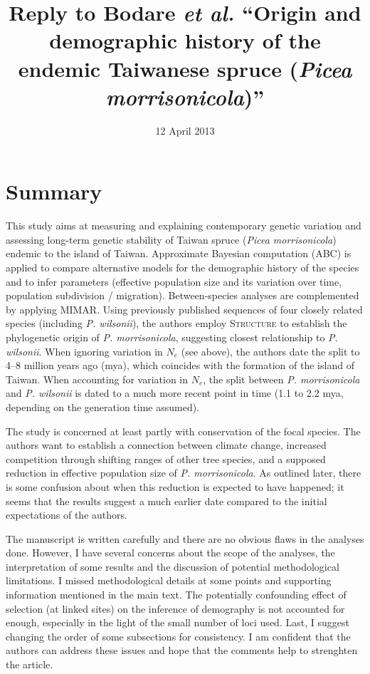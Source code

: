 \documentclass[11pt]{article}
\title{Reply to Bodare \emph{et al.} ``Origin and demographic history of the endemic Taiwanese spruce (\emph{Picea morrisonicola})''}
\date{12 April 2013}                                           %
\begin{document}
\maketitle

\section{Summary}
This study aims at measuring and explaining contemporary genetic variation and assessing long-term genetic stability of Taiwan spruce (\emph{Picea morrisonicola}) endemic to the island of Taiwan. Approximate Bayesian computation (ABC) is applied to compare alternative models for the demographic history of the species and to infer parameters (effective population size and its variation over time, population subdivision / migration). Between-species analyses are complemented by applying MIMAR. Using previously published sequences of four closely related species (including \emph{P. wilsonii}), the authors employ \textsc{Structure} to establish the phylogenetic origin of \emph{P. morrisonicola}, suggesting closest relationship to \emph{P. wilsonii}. When ignoring variation in $N_{e}$ (see above), the authors date the split to 4--8 million years ago (mya), which coincides with the formation of the island of Taiwan. When accounting for variation in $N_e$, the split between \emph{P. morrisonicola} and \emph{P. wilsonii} is dated to a much more recent point in time (1.1 to 2.2 mya, depending on the generation time assumed).

The study is concerned at least partly with conservation of the focal species. The authors want to establish a connection between climate change, increased competition through shifting ranges of other tree species, and a supposed reduction in effective population size of \emph{P. morrisonicola}. As outlined later, there is some confusion about when this reduction is expected to have happened; it seems that the results suggest a much earlier date compared to the initial expectations of the authors.

The manuscript is written carefully and there are no obvious flaws in the analyses done. However, I have several concerns about the scope of the analyses, the interpretation of some results and the discussion of potential methodological limitations. I missed methodological details at some points and supporting information mentioned in the main text. The potentially confounding effect of selection (at linked sites) on the inference of demography is not accounted for enough, especially in the light of the small number of loci used. Last, I suggest changing the order of some subsections for consistency. I am confident that the authors can address these issues and hope that the comments help to strenghten the article.
\end{document}
